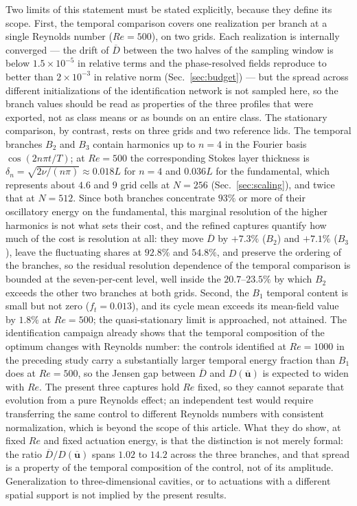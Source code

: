 \documentclass[11pt,a4paper]{article}
\newcommand{\Dbar}{\overline{D}}
\begin{document}
Two limits of this statement must be stated explicitly, because they define its
scope. First, the temporal comparison covers one realization per branch at a
single Reynolds number ($Re=500$), on two grids. Each realization is
internally converged --- the drift of $\Dbar$ between the two halves of the
sampling window is below
$1.5\times10^{-5}$ in relative terms and the phase-resolved fields reproduce to
better than $2\times10^{-3}$ in relative norm (Sec.~\ref{sec:budget}) --- but the
spread across different
initializations of the identification network is not sampled here, so the branch
values should be read as properties of the three profiles that were exported, not
as class means or as bounds on an entire class. The stationary
comparison, by contrast, rests on three grids and two reference lids. The temporal
branches $B_2$ and $B_3$ contain harmonics up to $n=4$ in the Fourier basis
$\cos(2n\pi t/T)$; at $Re=500$ the corresponding Stokes layer thickness is
$\delta_n=\sqrt{2\nu/(n\pi)}\approx0.018L$ for $n=4$ and $0.036L$ for the
fundamental, which represents about $4.6$ and $9$ grid cells at $N=256$
(Sec.~\ref{sec:scaling}), and twice that at $N=512$. Since both branches
concentrate $93\%$ or more of their oscillatory energy on the fundamental, this
marginal resolution of the higher harmonics is not what sets their cost, and the
refined captures quantify how much of the cost is resolution at all: they move
$\Dbar$ by $+7.3\%$ ($B_2$) and $+7.1\%$ ($B_3$), leave the fluctuating shares at
$92.8\%$ and $54.8\%$, and preserve the ordering of the branches, so the residual
resolution dependence of the temporal comparison is bounded at the seven-per-cent
level, well inside the $20.7$--$23.5\%$ by which $B_2$ exceeds the other two branches
at both grids. Second, the
$B_1$ temporal content is small but not zero ($f_t=0.013$), and its cycle mean
exceeds its mean-field value by $1.8\%$ at $Re=500$; the quasi-stationary limit is approached,
not attained. The identification campaign already shows that the temporal
composition of the optimum changes with Reynolds number: the controls identified at
$Re=1000$ in the preceding study \cite{beniaiche2026} carry a substantially larger
temporal energy fraction than $B_1$ does at $Re=500$, so the Jensen gap between
$\overline{D}$ and $D(\overline{\mathbf{u}})$ is expected to widen with $Re$. The
present three captures hold $Re$ fixed, so they cannot separate that evolution from
a pure Reynolds effect; an independent test would require transferring the same
control to different Reynolds numbers with consistent normalization, which is beyond
the scope of this article. What they do show, at fixed $Re$ and fixed actuation
energy, is that the distinction is not merely formal: the ratio
$\overline{D}/D(\overline{\mathbf{u}})$ spans $1.02$ to $14.2$ across the three
branches, and that spread is a property of the temporal composition of the control,
not of its amplitude. Generalization to three-dimensional cavities, or to actuations
with a different spatial support is not implied by the present results.
\end{document}
